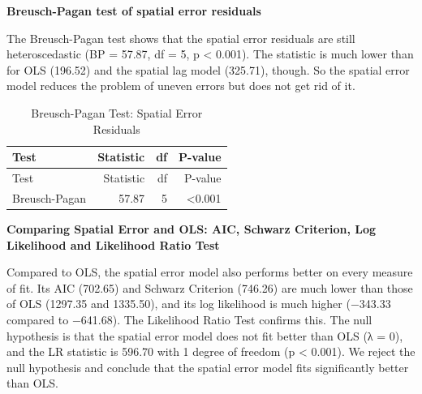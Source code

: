\documentclass[
  12pt,
]{article}
\begin{document}
\textbf{Breusch-Pagan test of spatial error residuals}

The Breusch-Pagan test shows that the spatial error residuals are still
heteroscedastic (BP = 57.87, df = 5, p \textless{} 0.001). The statistic
is much lower than for OLS (196.52) and the spatial lag model (325.71),
though. So the spatial error model reduces the problem of uneven errors
but does not get rid of it.

\begin{longtable}[]{@{}lrrr@{}}
\caption{Breusch-Pagan Test: Spatial Error Residuals}\tabularnewline
\toprule\noalign{}
Test & Statistic & df & P-value \\
\midrule\noalign{}
\endfirsthead
\toprule\noalign{}
Test & Statistic & df & P-value \\
\midrule\noalign{}
\endhead
\bottomrule\noalign{}
\endlastfoot
Breusch-Pagan & 57.87 & 5 & \textless0.001 \\
\end{longtable}

\textbf{Comparing Spatial Error and OLS: AIC, Schwarz Criterion, Log
Likelihood and Likelihood Ratio Test}

Compared to OLS, the spatial error model also performs better on every
measure of fit. Its AIC (702.65) and Schwarz Criterion (746.26) are much
lower than those of OLS (1297.35 and 1335.50), and its log likelihood is
much higher (−343.33 compared to −641.68). The Likelihood Ratio Test
confirms this. The null hypothesis is that the spatial error model does
not fit better than OLS (λ = 0), and the LR statistic is 596.70 with 1
degree of freedom (p \textless{} 0.001). We reject the null hypothesis
and conclude that the spatial error model fits significantly better than
OLS.
\end{document}
